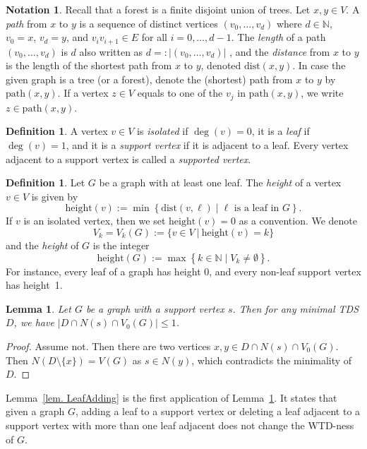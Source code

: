\documentclass[12pt, reqno]{amsart}
\theoremstyle{definition}
\theoremstyle{plain}
\newtheorem{lemma}[theorem]{Lemma}
\theoremstyle{definition}
\newtheorem{notation}[theorem]{Notation}
\newtheorem{definition}[theorem]{Definition}
\newcommand{\dist}{\text{dist}}
\newcommand{\pth}{\mbox{path}}
\newcommand{\hh}{\mbox{height}}
\newcommand\Set[2]{\left\lbrace #1 \mid #2 \right\rbrace}
\begin{document}
\begin{notation}
    Recall that a forest is a finite disjoint union of trees.
    Let $x,y \in V$.
    A \emph{path} from $x$ to $y$ is a sequence of distinct vertices $(v_0,\dots,v_d)$ where $d \in \mathbb{N}$, $v_0 = x$, $v_d = y$, and $v_iv_{i+1} \in E$ for all $i = 0,\dots,d-1$.
    The \emph{length} of a path $(v_0,\dots,v_d)$ is $d$ also written as $d =: |(v_0,\dots,v_d)|$ , and the \emph{distance} from $x$ to $y$ is the length of the shortest path from $x$ to $y$, denoted $\dist(x,y)$.
    In case the given graph is a tree (or a forest), denote the (shortest) path from $x$ to $y$ by $\pth(x,y)$.
    If a vertex $z \in V$ equals to one of the $v_j$ in $\mbox{path}(x,y)$, we write $z \in \pth(x,y)$.
\end{notation}

\begin{definition}
A vertex $v \in V$ is \emph{isolated} if $\deg(v) = 0$, it is a \emph{leaf} if $\deg(v) = 1$, and it is a \emph{support vertex} if it is adjacent to a leaf.
Every vertex adjacent to a support vertex is called a \emph{supported vertex}.
\end{definition}

\begin{definition}
Let $G$ be a graph with at least one leaf.
The \emph{height} of a vertex $v \in V$ is given by
$$
\hh(v) := \min\Set{\dist(v,\ell)}{\ell \mbox{ is a leaf in } G}.
$$ 
If $v$ is an isolated vertex, then we set $\hh(v) = 0$ as a convention. 
We denote 
$$
V_k = V_k(G) := \{v \in V\ |\  \hh(v) = k\}
$$ 
and the \emph{height} of $G$ is the integer 
$$
\hh(G) := \max\Set{k \in \mathbb{N}}{V_k \neq \emptyset}.
$$
For instance, every leaf of a graph has height 0, and every non-leaf support vertex has height~1.
\end{definition}


\begin{lemma}
\label{lem. singleLeaf in a min TD set}
Let $G$ be a graph with a support vertex $s$.
Then for any minimal TDS $D$, we have $|D \cap N(s) \cap V_0(G)| \leq 1$.
\end{lemma}

\begin{proof}
Assume not. 
Then there are two vertices $x,y \in D \cap N(s) \cap V_0(G)$.
Then $N(D \setminus \{x\}) = V(G)$ as $s \in N(y)$, which contradicts the minimality of $D$. 
\end{proof}

Lemma~\ref{lem. LeafAdding} is the first application of Lemma~\ref{lem. singleLeaf in a min TD set}.
It states that given a graph $G$, adding a leaf to a support vertex or deleting a leaf adjacent to a support vertex with more than one leaf adjacent  does not change the WTD-ness of $G$.
\end{document}
